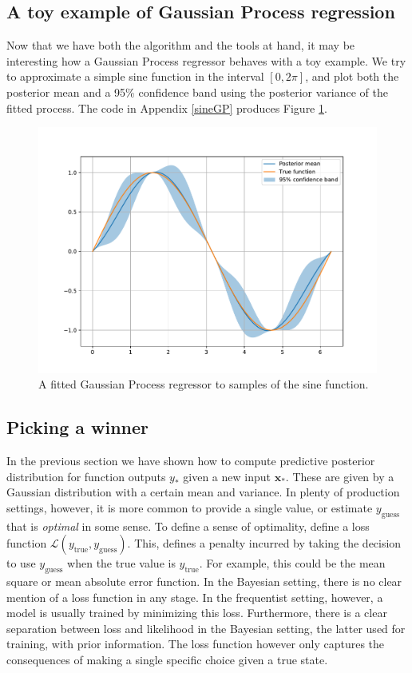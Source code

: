 \documentclass[10pt,a4paper,twoside]{book}
\begin{document}
\subsection{A toy example of Gaussian Process regression}

Now that we have both the algorithm and the tools at hand, it may be interesting how a Gaussian Process regressor behaves with a toy example. We try to approximate a simple sine function in the interval $[0, 2\pi]$, and plot both the posterior mean and a 95\% confidence band using the posterior variance of the fitted process. The code in Appendix \ref{sineGP} produces Figure \ref{fig:GPsine}.\\


\begin{figure}
\caption{A fitted Gaussian Process regressor to samples of the sine function.}
\label{fig:GPsine}
\includegraphics[width=\textwidth]{figures/chapter2/GPsine}
\end{figure}

\subsection{Picking a winner}

In the previous section we have shown how to compute predictive posterior distribution for function outputs $y_*$ given a new input $\boldsymbol{x}_*$. These are given by a Gaussian distribution with a certain mean and variance. In plenty of production settings, however, it is more common to provide a single value, or estimate $y_{\mathrm{guess}}$ that is \textit{optimal} in some sense. To define a sense of optimality, define a loss function $\mathcal{L}(y_{\mathrm{true}}, y_{\mathrm{guess}})$. This, defines a penalty incurred by taking the decision to use $y_{\mathrm{guess}}$ when the true value is $y_{\mathrm{true}}$. For example, this could be the mean square or mean absolute error function. In the Bayesian setting, there is no clear mention of a loss function in any stage. In the frequentist setting, however, a model is usually trained by minimizing this loss. Furthermore, there is a clear separation between loss and likelihood in the Bayesian setting, the latter used for training, with prior information. The loss function however only captures the consequences of making a single specific choice given a true state.\\
\end{document}
